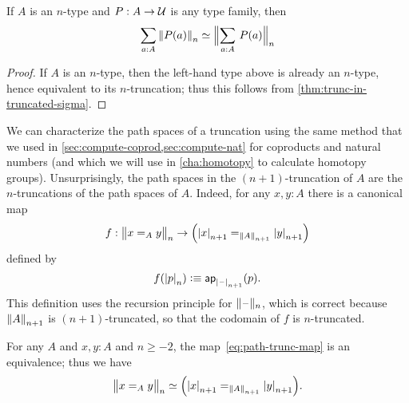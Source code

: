 \begin{cor}\label{thm:refl-over-ntype-base}
  If $A$ is an $n$-type and $P:A\to\type$ is any type family, then
  \[ \eqv{\sm{a:A} \trunc n{P(a)}}{\Trunc n{\sm{a:A}P(a)}} \]
\end{cor}
\begin{proof}
  If $A$ is an $n$-type, then the left-hand type above is already an $n$-type, hence equivalent to its $n$-truncation; thus this follows from \autoref{thm:trunc-in-truncated-sigma}.
\end{proof}

We can characterize the path spaces of a truncation using the same method that we used in \autoref{sec:compute-coprod,sec:compute-nat} for
coproducts and natural numbers (and which we will use in \autoref{cha:homotopy} to calculate homotopy groups).
Unsurprisingly, the path spaces in the $(n+1)$-truncation of $A$ are the $n$-truncations of the path spaces of $A$.
Indeed, for any $x,y:A$ there is a canonical map
\begin{equation}
  f:\ttrunc n{x=_Ay}\to \Big(\tproj {n+1}x=_{\trunc{n+1}A}\tproj {n+1}y\Big)\label{eq:path-trunc-map}
\end{equation}
defined by
\[f(\tproj n{p})\defeq \apfunc{\tprojf {n+1}}(p). \]
This definition uses the recursion principle for $\truncf n$, which is correct because $\trunc {n+1}A$ is $(n+1)$-truncated, so that the
codomain of $f$ is $n$-truncated.

\begin{thm} \label{thm:path-truncation}
  For any $A$ and $x,y:A$ and $n\ge -2$, the map~\eqref{eq:path-trunc-map} is an equivalence; thus we have
  \[ \eqv{\ttrunc n{x=_Ay}}{\Big(\tproj {n+1}x=_{\trunc{n+1}A}\tproj {n+1}y\Big)}. \]
\end{thm}

